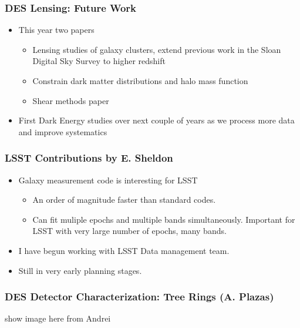 \documentclass{beamer}
\begin{document}
\frame
{
    \frametitle{DES Lensing: Future Work}
    \begin{itemize}
        \item This year two papers
            \begin{itemize}
                \item Lensing studies of galaxy clusters, extend previous work
                    in the Sloan Digital Sky Survey to higher redshift
                \item Constrain dark matter distributions and halo mass function
                \item Shear methods paper
            \end{itemize}
        \item First Dark Energy studies over next couple of years as we
            process more data and improve systematics
    \end{itemize}
}

\frame
{

    \frametitle{LSST Contributions by E. Sheldon}
    \begin{itemize}
        \item Galaxy measurement code is interesting for LSST
            \begin{itemize}

                \item An order of magnitude faster than standard codes.
                \item Can fit muliple epochs and multiple bands simultaneously.  Important
                    for LSST with very large number of epochs, many bands.
            \end{itemize}

        \item I have begun working with LSST Data management team.
        \item Still in very early planning stages.

    \end{itemize}
}

\frame
{

    \frametitle{DES Detector Characterization: Tree Rings (A. Plazas)}

    show image here from Andrei
}
\end{document}
